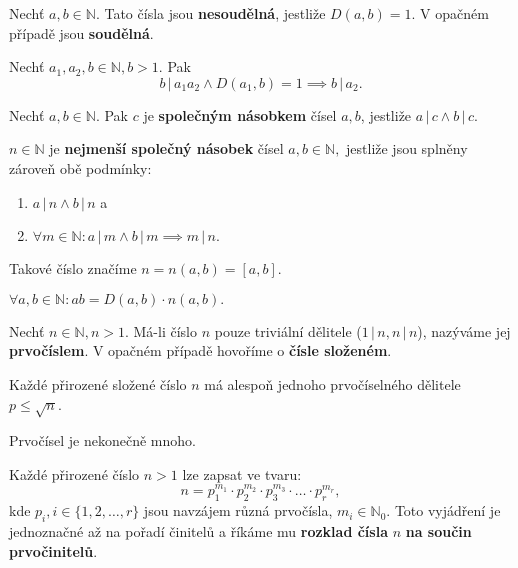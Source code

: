 \begin{definition}
  Nechť $a,b\in \mathbb N.$ Tato čísla jsou \textbf{nesoudělná}, jestliže $D(a,b)=1$. V opačném případě jsou \textbf{soudělná}.
\end{definition}

\begin{veta}
  Nechť $a_1,a_2,b\in \mathbb N, b>1.$ Pak
  $$b \, | \, a_1a_2 \land D(a_1,b)=1\implies b\, | \, a_2.$$
\end{veta}

\begin{definition}
  Nechť $a,b\in \mathbb N.$ Pak $c$ je \textbf{společným násobkem} čísel $a,b$, jestliže $a \, | \, c \land b\, | \, c.$
\end{definition}

\begin{definition}
  $n\in \mathbb N$ je \textbf{nejmenší společný násobek} čísel $a,b \in \mathbb N,$ jestliže jsou splněny zároveň obě podmínky:
  \begin{enumerate}[$i.$]
    \item $a\, | \, n \land b \, | \, n$ a
    \item $\forall m \in \mathbb N: a \, | \, m \land b \, | \, m \implies m \, | \, n.$
  \end{enumerate}
  Takové číslo značíme $n=n(a,b)=\left [ a,b\right ] .$
\end{definition}

\begin{veta}
  $\forall a,b \in \mathbb N: ab=D(a,b)\cdot n(a,b).$
\end{veta}

\begin{definition}
  Nechť $n\in \mathbb N, n>1.$ Má-li číslo $n$ pouze triviální dělitele ($1 \, | \, n, n \, | \, n$), nazýváme jej \textbf{prvočíslem}. V opačném případě hovoříme o \textbf{čísle složeném}.
\end{definition}

\begin{veta}
  Každé přirozené složené číslo $n$ má alespoň jednoho prvočíselného dělitele $p\leq \sqrt{n}$.
\end{veta}

\begin{veta}
  Prvočísel je nekonečně mnoho.
\end{veta}

\begin{veta}
  Každé přirozené číslo $n>1$ lze zapsat ve tvaru:
  $$n=p_1^{m_1}\cdot p_2^{m_2} \cdot p_3^{m_3}\cdot \hdots \cdot p_r^{m_r},$$
  kde $p_i,i\in\{ 1, 2, \dots, r \}$ jsou navzájem různá prvočísla, $m_i\in \mathbb N_0$. Toto vyjádření je jednoznačné až na pořadí činitelů a říkáme mu \textbf{rozklad čísla} $n$ \textbf{na součin prvočinitelů}.
\end{veta}

